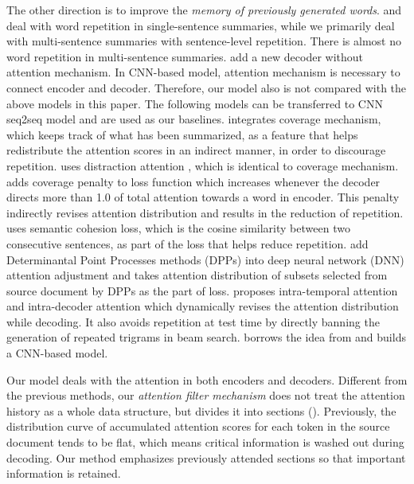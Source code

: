 The other direction is to improve the 
{\em memory of previously generated words}.
\cite{SuzukiN17} and \cite{LinSMS18} 
deal with word repetition in single-sentence summaries, 
while we primarily deal with multi-sentence summaries with 
sentence-level repetition. 
There is almost no word repetition in multi-sentence summaries.
\cite{JiangB18} add a new decoder without attention mechanism.
In CNN-based model, attention mechanism is necessary to connect encoder 
and decoder.
Therefore, our model also is not compared with the above models in this paper. 
The following models can be transferred to CNN seq2seq model and
are used as our baselines.
\cite{SeeLM17} integrates coverage mechanism, 
which keeps track of what has been summarized, as a feature that helps 
redistribute the attention scores in an indirect manner,
in order to discourage repetition. 
\cite{TanWX17} uses distraction attention
\citep{ChenZLWJ16}, which is identical to coverage mechanism. 
\cite{GehrmannDR18} adds coverage penalty to loss function
which increases whenever the decoder directs more than 1.0 of total attention
towards a word in encoder.
This penalty indirectly revises attention distribution and results in
the reduction of repetition.
\cite{elikyilmazBHC18} uses semantic cohesion loss,
which is the cosine similarity between two consecutive sentences, as part of
the loss that helps reduce repetition.
\cite{DivC2C19} add Determinantal Point Processes methods (DPPs)
into deep neural network (DNN) attention adjustment
and takes attention distribution of
subsets selected from source document by DPPs as the part of loss.
\cite{PaulusXS17} proposes intra-temporal attention \citep{NallapatiZSGX16} and 
intra-decoder attention which dynamically revises the attention distribution while decoding. 
It also avoids repetition at test time by directly banning the generation of 
repeated trigrams in beam search. 
\cite{FanGA18} borrows the idea from \cite{PaulusXS17} and 
builds a CNN-based model. 

Our model deals with the attention in both encoders and decoders. 
Different from the previous methods, 
our \textit{attention filter mechanism} does not 
treat the attention history as a whole data structure,  
but divides it into sections (). 
Previously, the distribution curve of accumulated attention scores 
for each token in the source document tends to be flat, 
which means critical information is washed out during decoding.
Our method emphasizes previously attended sections 
so that important information is retained.

